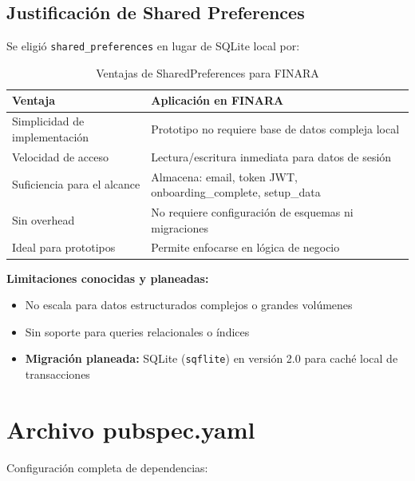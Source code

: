 \subsection{Justificación de Shared Preferences}

Se eligió \texttt{shared\_preferences} en lugar de SQLite local por:

\begin{table}[H]
\centering
\begin{tabularx}{\textwidth}{|p{5.2cm}|X|}
\hline
\textbf{Ventaja} & \textbf{Aplicación en FINARA} \\
\hline
Simplicidad de implementación & Prototipo no requiere base de datos compleja local \\
\hline
Velocidad de acceso & Lectura/escritura inmediata para datos de sesión \\
\hline
Suficiencia para el alcance & Almacena: email, token JWT, onboarding\_complete, setup\_data \\
\hline
Sin overhead & No requiere configuración de esquemas ni migraciones \\
\hline
Ideal para prototipos & Permite enfocarse en lógica de negocio \\
\hline
\end{tabularx}
\caption{Ventajas de SharedPreferences para FINARA}
\end{table}

\textbf{Limitaciones conocidas y planeadas:}
\begin{itemize}
    \item No escala para datos estructurados complejos o grandes volúmenes
    \item Sin soporte para queries relacionales o índices
    \item \textbf{Migración planeada:} SQLite (\texttt{sqflite}) en versión 2.0 para caché local de transacciones
\end{itemize}

\section{Archivo pubspec.yaml}

Configuración completa de dependencias:

